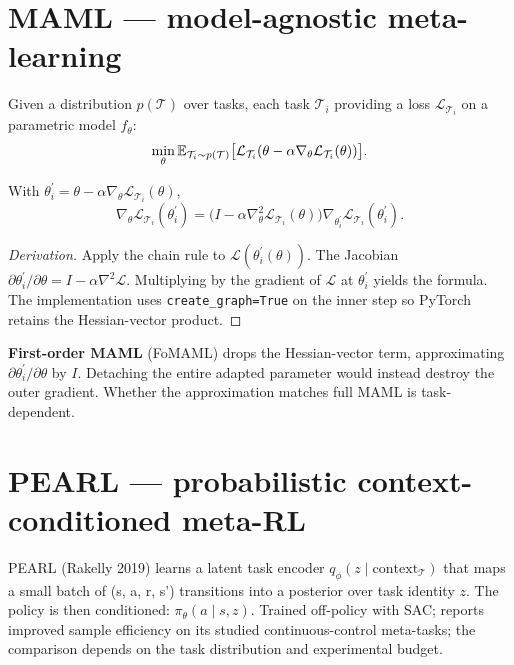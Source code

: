 \documentclass[11pt,oneside]{scrbook}
\begin{document}
\section{MAML --- model-agnostic meta-learning}

\begin{definition}
Given a distribution $p(\mathcal T)$ over tasks, each task $\mathcal T_i$ providing a loss $\mathcal L_{\mathcal T_i}$ on a parametric model $f_\theta$:
\[
  \min_\theta \mathbb{E}_{\mathcal T_i \sim p(\mathcal T)}\bigl[ \mathcal L_{\mathcal T_i}(\theta - \alpha \nabla_\theta \mathcal L_{\mathcal T_i}(\theta)) \bigr].
\]
\end{definition}

\begin{theorem}
With $\theta_i^\prime = \theta - \alpha \nabla_\theta \mathcal L_{\mathcal T_i}(\theta)$,
\[
  \nabla_\theta \mathcal L_{\mathcal T_i}(\theta_i^\prime) = \bigl(I - \alpha \nabla^2_\theta \mathcal L_{\mathcal T_i}(\theta)\bigr) \nabla_{\theta_i^\prime} \mathcal L_{\mathcal T_i}(\theta_i^\prime).
\]
\end{theorem}

\begin{proof}[Derivation]
Apply the chain rule to $\mathcal L(\theta_i^\prime(\theta))$. The Jacobian $\partial \theta_i^\prime / \partial \theta = I - \alpha \nabla^2 \mathcal L$. Multiplying by the gradient of $\mathcal L$ at $\theta_i^\prime$ yields the formula. The implementation uses \texttt{create\_graph=True} on the inner step so PyTorch retains the Hessian-vector product.
\end{proof}

\textbf{First-order MAML} (FoMAML) drops the Hessian-vector term, approximating $\partial\theta_i^\prime/\partial\theta$ by $I$. Detaching the entire adapted parameter would instead destroy the outer gradient. Whether the approximation matches full MAML is task-dependent.

\section{PEARL --- probabilistic context-conditioned meta-RL}

PEARL (Rakelly 2019) learns a latent task encoder $q_\phi(z \mid \mathrm{context}_{\mathcal T})$ that maps a small batch of (s, a, r, s') transitions into a posterior over task identity $z$. The policy is then conditioned: $\pi_\theta(a \mid s, z)$. Trained off-policy with SAC; reports improved sample efficiency on its studied continuous-control meta-tasks; the comparison depends on the task distribution and experimental budget.
\end{document}
